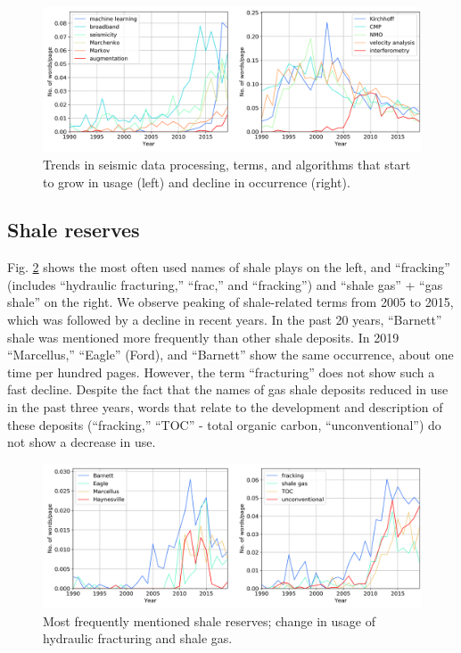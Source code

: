\documentclass[geosciences,article,submit,moreauthors,pdftex]{Definitions/mdpi}
\begin{document}
\begin{figure}[ht!]

\includegraphics[width=\textwidth]{proc_meth.png} 
\caption{Trends in seismic data processing, terms, and algorithms that start to grow in usage (left) and decline in occurrence (right).}
\label{proc_meth}
\end{figure}




\subsection{Shale reserves} 
Fig. \ref{shales_frac} shows the most often used names of shale plays on the left, and ``fracking'' (includes ``hydraulic fracturing,'' ``frac,'' and ``fracking'') and ``shale gas'' + ``gas shale'' on the right. We observe peaking of shale-related terms from 2005 to 2015, which was followed by a decline in recent years. In the past 20 years, ``Barnett'' shale was mentioned more frequently than other shale deposits. In 2019 ``Marcellus,'' ``Eagle'' (Ford), and ``Barnett'' show the same occurrence, about one time per hundred pages. However, the term ``fracturing'' does not show such a fast decline. Despite the fact that the names of gas shale deposits reduced in use in the past three years, words that relate to the development and description of these deposits (``fracking,'' ``TOC'' - total organic carbon, ``unconventional'') do not show a decrease in use.


\begin{figure}[ht!]

\includegraphics[width=\textwidth]{shale_frac.png}

\caption{Most frequently mentioned shale reserves; change in usage of hydraulic fracturing and shale gas.}
\label{shales_frac}
\end{figure}
\end{document}
